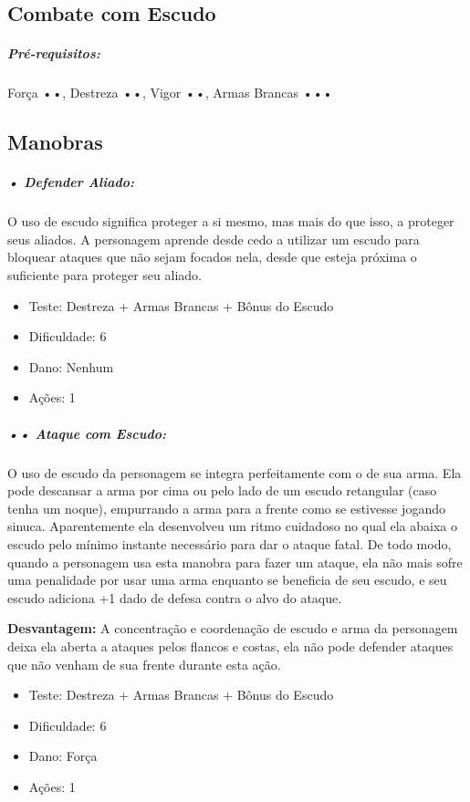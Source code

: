 
\subsection{\bf Combate com Escudo}

\subparagraph*{\bf Pré-requisitos:} Força ••, Destreza ••, Vigor ••, Armas Brancas •••

\subsection{\bf Manobras}

\subparagraph{\bf • Defender Aliado:}
O uso de escudo significa proteger a si mesmo, mas mais do que isso, a proteger seus aliados. A personagem aprende desde cedo a utilizar um escudo para bloquear ataques que não sejam focados nela, desde que esteja próxima o suficiente para proteger seu aliado.
\begin{itemize}[noitemsep]
\item Teste: Destreza + Armas Brancas + Bônus do Escudo
\item Dificuldade: 6
\item Dano: Nenhum
\item Ações: 1
\end{itemize}

\subparagraph{\bf •• Ataque com Escudo:}
O uso de escudo da personagem se integra perfeitamente com o de sua arma. Ela pode descansar a arma por cima ou pelo lado de um escudo retangular (caso tenha um noque), empurrando a arma para a frente como se estivesse jogando sinuca. Aparentemente ela desenvolveu um ritmo cuidadoso no qual ela abaixa o escudo pelo mínimo instante necessário para dar o ataque fatal. De todo modo, quando a personagem usa esta manobra para fazer um ataque, ela não mais sofre uma penalidade por usar uma arma enquanto se beneficia de seu escudo, e seu escudo adiciona +1 dado de defesa contra o alvo do ataque.

{\bf Desvantagem:} A concentração e coordenação de escudo e arma da personagem deixa ela aberta a ataques pelos flancos e costas, ela não pode defender ataques que não venham de sua frente durante esta ação.
\begin{itemize}[noitemsep]
\item Teste: Destreza + Armas Brancas + Bônus do Escudo
\item Dificuldade: 6
\item Dano: Força
\item Ações: 1
\end{itemize}

